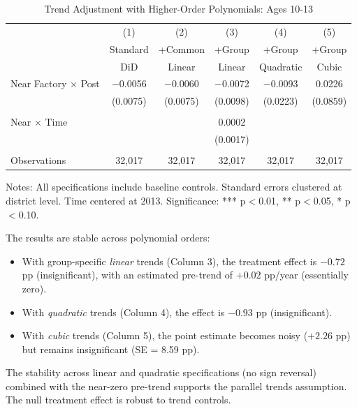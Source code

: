 \documentclass[12pt]{article}
\begin{document}
\begin{table}[H]
\centering
\caption{Trend Adjustment with Higher-Order Polynomials: Ages 10-13}
\label{tab:trend_orders}
\begin{threeparttable}
\begin{tabular}{lccccc}
\toprule
& (1) & (2) & (3) & (4) & (5) \\
& Standard & +Common & +Group & +Group & +Group \\
& DiD & Linear & Linear & Quadratic & Cubic \\
\midrule
Near Factory $\times$ Post & $-$0.0056 & $-$0.0060 & $-$0.0072 & $-$0.0093 & 0.0226 \\
& (0.0075) & (0.0075) & (0.0098) & (0.0223) & (0.0859) \\
\\
Near $\times$ Time & & & 0.0002 & & \\
& & & (0.0017) & & \\
\\
\midrule
Observations & 32,017 & 32,017 & 32,017 & 32,017 & 32,017 \\
\bottomrule
\end{tabular}
\begin{tablenotes}
\footnotesize
\item Notes: All specifications include baseline controls. Standard errors clustered at district level. Time centered at 2013. Significance: *** p$<$0.01, ** p$<$0.05, * p$<$0.10.
\end{tablenotes}
\end{threeparttable}
\end{table}

The results are stable across polynomial orders:
\begin{itemize}
\item With group-specific \textit{linear} trends (Column 3), the treatment effect is $-0.72$ pp (insignificant), with an estimated pre-trend of $+0.02$ pp/year (essentially zero).
\item With \textit{quadratic} trends (Column 4), the effect is $-0.93$ pp (insignificant).
\item With \textit{cubic} trends (Column 5), the point estimate becomes noisy ($+2.26$ pp) but remains insignificant (SE = 8.59 pp).
\end{itemize}

The stability across linear and quadratic specifications (no sign reversal) combined with the near-zero pre-trend supports the parallel trends assumption. The null treatment effect is robust to trend controls.
\end{document}
